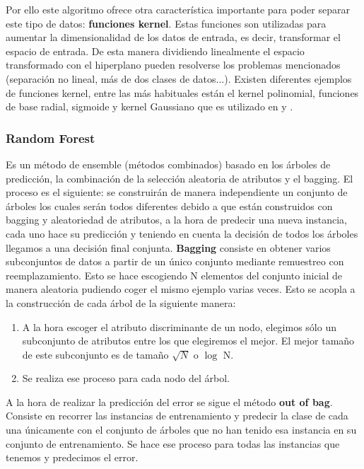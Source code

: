 Por ello este algoritmo ofrece otra característica importante para poder separar este tipo de datos: \textbf{funciones kernel}. Estas funciones son utilizadas para aumentar la dimensionalidad de los datos de entrada, es decir, transformar el espacio de entrada. De esta manera dividiendo linealmente el espacio transformado con el hiperplano pueden resolverse los problemas mencionados (separación no lineal, más de dos clases de datos...).  Existen diferentes ejemplos de funciones kernel, entre las más habituales están el kernel polinomial, funciones de base radial, sigmoide y kernel Gaussiano que es utilizado en \cite{MxLtNovel} y \cite{Orz2016}.

\subsubsection{Random Forest \cite{breiman2001random}}

Es un método de ensemble (métodos combinados) basado en los árboles de predicción, la combinación de la selección aleatoria de atributos y el bagging. El proceso es el siguiente: se construirán de manera independiente un conjunto de árboles los cuales serán todos diferentes debido a que están construidos con bagging y aleatoriedad de atributos, a la hora de predecir una nueva instancia, cada uno hace su predicción y teniendo en cuenta la decisión de todos los árboles llegamos a una decisión final conjunta. \textbf{Bagging} consiste en obtener varios subconjuntos de datos a partir de un único conjunto mediante remuestreo con reemplazamiento. Esto se hace escogiendo N elementos del conjunto inicial de manera aleatoria pudiendo coger el mismo ejemplo varias veces. Esto se acopla a la construcción de cada árbol de la siguiente manera:
\begin{enumerate}
	\item A la hora escoger el atributo discriminante de un nodo, elegimos sólo un subconjunto de atributos entre los que elegiremos el mejor. El mejor tamaño de este subconjunto es de tamaño $\sqrt{N}$ o $\log$ N.
	\item Se realiza ese proceso para cada nodo del árbol.
\end{enumerate}
A la hora de realizar la predicción del error se sigue el método \textbf{out of bag}. Consiste en recorrer las instancias de entrenamiento y predecir la clase de cada una únicamente con el conjunto de árboles que no han tenido esa instancia en su conjunto de entrenamiento. Se hace ese proceso para todas las instancias que tenemos y predecimos el error.


